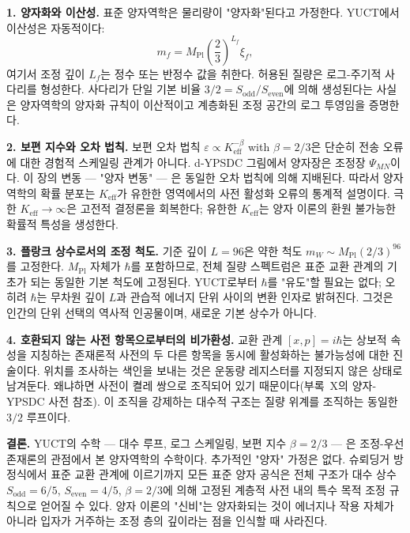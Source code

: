\documentclass[11pt,a4paper]{article}
\begin{document}
	\medskip
	\noindent\textbf{1. 양자화와 이산성.}
	표준 양자역학은 물리량이 "양자화"된다고 가정한다. YUCT에서 이산성은 자동적이다:
	\[
	m_f = M_{\mathrm{Pl}} \left( \frac{2}{3} \right)^{L_f} \xi_f,
	\]
	여기서 조정 깊이 $L_f$는 정수 또는 반정수 값을 취한다. 허용된 질량은 로그-주기적 사다리를 형성한다. 사다리가 단일 기본 비율 $3/2 = S_{\mathrm{odd}}/S_{\mathrm{even}}$에 의해 생성된다는 사실은 양자역학의 양자화 규칙이 이산적이고 계층화된 조정 공간의 로그 투영임을 증명한다.
	
	\medskip
	\noindent\textbf{2. 보편 지수와 오차 법칙.}
	보편 오차 법칙 $\varepsilon \propto K_{\mathrm{eff}}^{-\beta}$ with $\beta = 2/3$은 단순히 전송 오류에 대한 경험적 스케일링 관계가 아니다. d‑YPSDC 그림에서 양자장은 조정장 $\Psi_{MN}$이다. 이 장의 변동 — "양자 변동" — 은 동일한 오차 법칙에 의해 지배된다. 따라서 양자역학의 확률 분포는 $K_{\mathrm{eff}}$가 유한한 영역에서의 사전 활성화 오류의 통계적 설명이다. 극한 $K_{\mathrm{eff}}\to\infty$은 고전적 결정론을 회복한다; 유한한 $K_{\mathrm{eff}}$는 양자 이론의 환원 불가능한 확률적 특성을 생성한다.
	
	\medskip
	\noindent\textbf{3. 플랑크 상수로서의 조정 척도.}
	기준 깊이 $L=96$은 약한 척도 $m_W \sim M_{\mathrm{Pl}}(2/3)^{96}$를 고정한다. $M_{\mathrm{Pl}}$ 자체가 $\hbar$를 포함하므로, 전체 질량 스펙트럼은 표준 교환 관계의 기초가 되는 동일한 기본 척도에 고정된다. YUCT로부터 $\hbar$를 "유도"할 필요는 없다; 오히려 $\hbar$는 무차원 깊이 $L$과 관습적 에너지 단위 사이의 변환 인자로 밝혀진다. 그것은 인간의 단위 선택의 역사적 인공물이며, 새로운 기본 상수가 아니다.
	
	\medskip
	\noindent\textbf{4. 호환되지 않는 사전 항목으로부터의 비가환성.}
	교환 관계 $[x,p]=i\hbar$는 상보적 속성을 지칭하는 존재론적 사전의 두 다른 항목을 동시에 활성화하는 불가능성에 대한 진술이다. 위치를 조사하는 색인을 보내는 것은 운동량 레지스터를 지정되지 않은 상태로 남겨둔다. 왜냐하면 사전이 켤레 쌍으로 조직되어 있기 때문이다(부록~X의 양자-YPSDC 사전 참조). 이 조직을 강제하는 대수적 구조는 질량 위계를 조직하는 동일한 $3/2$ 루프이다.
	
	\medskip
	\noindent
	\textbf{결론.} YUCT의 수학 — 대수 루프, 로그 스케일링, 보편 지수 $\beta=2/3$ — 은 조정-우선 존재론의 관점에서 본 양자역학의 수학이다. 추가적인 "양자" 가정은 없다. 슈뢰딩거 방정식에서 표준 교환 관계에 이르기까지 모든 표준 양자 공식은 전체 구조가 대수 상수 $S_{\mathrm{odd}}=6/5$, $S_{\mathrm{even}}=4/5$, $\beta=2/3$에 의해 고정된 계층적 사전 내의 특수 목적 조정 규칙으로 얻어질 수 있다. 양자 이론의 "신비"는 양자화되는 것이 에너지나 작용 자체가 아니라 입자가 거주하는 조정 층의 깊이라는 점을 인식할 때 사라진다.
	
\end{document}

